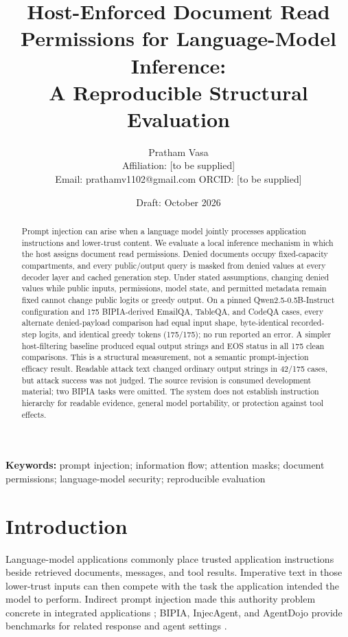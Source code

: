 \documentclass[11pt]{article}
\title{Host-Enforced Document Read Permissions for Language-Model Inference:\\A Reproducible Structural Evaluation}
\author{Pratham Vasa\\\small Affiliation: [to be supplied]\\\small Email: prathamv1102@gmail.com \quad ORCID: [to be supplied]}
\date{Draft: October 2026}
\begin{document}
\maketitle

\begin{abstract}
Prompt injection can arise when a language model jointly processes application instructions and lower-trust content. We evaluate a local inference mechanism in which the host assigns document read permissions. Denied documents occupy fixed-capacity compartments, and every public/output query is masked from denied values at every decoder layer and cached generation step. Under stated assumptions, changing denied values while public inputs, permissions, model state, and permitted metadata remain fixed cannot change public logits or greedy output. On a pinned Qwen2.5-0.5B-Instruct configuration and 175 BIPIA-derived EmailQA, TableQA, and CodeQA cases, every alternate denied-payload comparison had equal input shape, byte-identical recorded-step logits, and identical greedy tokens (175/175); no run reported an error. A simpler host-filtering baseline produced equal output strings and EOS status in all 175 clean comparisons. This is a structural measurement, not a semantic prompt-injection efficacy result. Readable attack text changed ordinary output strings in 42/175 cases, but attack success was not judged. The source revision is consumed development material; two BIPIA tasks were omitted. The system does not establish instruction hierarchy for readable evidence, general model portability, or protection against tool effects.
\end{abstract}

\noindent\textbf{Keywords:} prompt injection; information flow; attention masks; document permissions; language-model security; reproducible evaluation

\section{Introduction}

Language-model applications commonly place trusted application instructions beside retrieved documents, messages, and tool results. Imperative text in those lower-trust inputs can then compete with the task the application intended the model to perform. Indirect prompt injection made this authority problem concrete in integrated applications \citep{greshake2023}; BIPIA, InjecAgent, and AgentDojo provide benchmarks for related response and agent settings \citep{yi2025bipia,zhan2024injecagent,deb2024agentdojo}.
\end{document}
